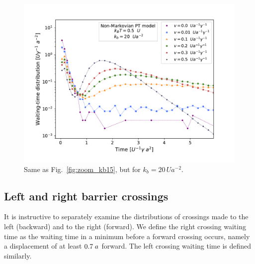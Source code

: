 \begin{figure}
    \centering
    \includegraphics[width=\textwidth]{zoom_kb20.pdf}
    \caption{Same as Fig.~\ref{fig:zoom_kb15}, but for $k_b=20\, Ua^{-2}$.}
    \label{fig:zoom_kb20}
\end{figure}
\clearpage
\subsection{Left and right barrier crossings}
It is instructive to separately examine the distributions of crossings made to the left (backward) and to the right (forward). We define the right crossing waiting time as the waiting time in a minimum before a forward crossing occurs, namely a displacement of at least $0.7\hspace{0.1cm}a$ forward. The left crossing waiting time is defined similarly.

